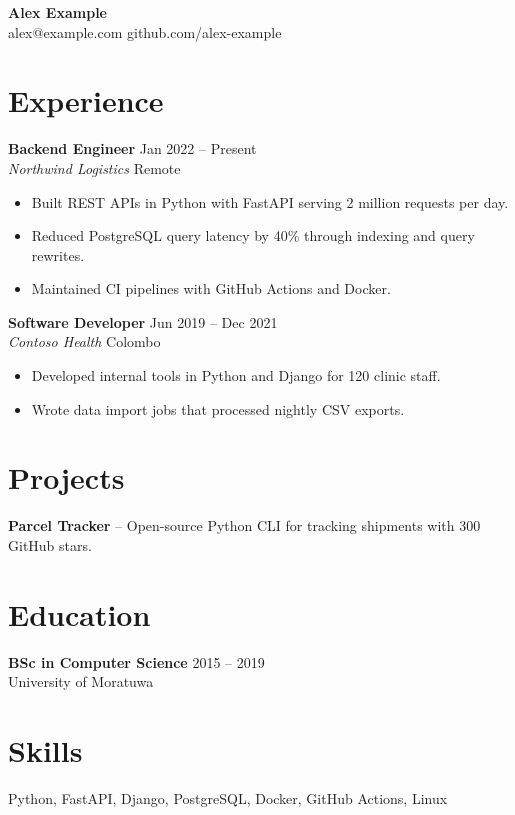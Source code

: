 \documentclass[11pt]{article}
\begin{document}
\begin{center}
{\Large \textbf{Alex Example}} \\
alex@example.com \quad github.com/alex-example
\end{center}

\section{Experience}
\textbf{Backend Engineer} \hfill Jan 2022 -- Present \\
\textit{Northwind Logistics} \hfill Remote
\begin{itemize}
  \item Built REST APIs in Python with FastAPI serving 2 million requests per day.
  \item Reduced PostgreSQL query latency by 40\% through indexing and query rewrites.
  \item Maintained CI pipelines with GitHub Actions and Docker.
\end{itemize}

\textbf{Software Developer} \hfill Jun 2019 -- Dec 2021 \\
\textit{Contoso Health} \hfill Colombo
\begin{itemize}
  \item Developed internal tools in Python and Django for 120 clinic staff.
  \item Wrote data import jobs that processed nightly CSV exports.
\end{itemize}

\section{Projects}
\textbf{Parcel Tracker} -- Open-source Python CLI for tracking shipments with 300 GitHub stars.

\section{Education}
\textbf{BSc in Computer Science} \hfill 2015 -- 2019 \\
University of Moratuwa

\section{Skills}
Python, FastAPI, Django, PostgreSQL, Docker, GitHub Actions, Linux
\end{document}
